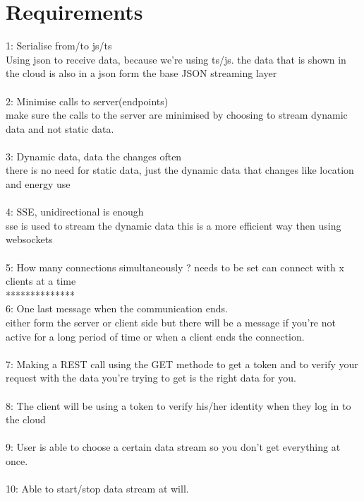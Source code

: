 \documentclass{article}
\begin{document}
\section{Requirements}\label{sec:requirements}
1: Serialise from/to js/ts\\
Using json to receive data, because we're using ts/js.
the data that is shown in the cloud is also in a json form 
the base JSON streaming layer\\
\\
2: Minimise calls to server(endpoints)\\
make sure the calls to the server are minimised by choosing to stream dynamic data and not static data.\\
\\
3: Dynamic data, data the changes often\\
there is no need for static data, just the dynamic data that changes like location and energy use \\
\\
4: SSE, unidirectional is enough\\
sse is used to stream the dynamic data this is a more efficient way then using websockets\\
\\
5: How many connections simultaneously ? needs to be set
can connect with x clients at a time\\ **************
\\
6: One last message when the communication ends. \\
either form the server or client side but there will be a message if you're not active for a long period of time or when a client ends the connection. \\
\\
7: Making a REST call using the GET methode to get a token and to verify your request with the data you're trying to get is the right data for you.\\
\\
8: The client will be using a token to verify his/her identity when they log in to the cloud\\
\\
9: User is able to choose a certain data stream so you don't get everything at once.\\
\\
10: Able to start/stop data stream at will.\\
\\

\cleardoublepage
\end{document}
